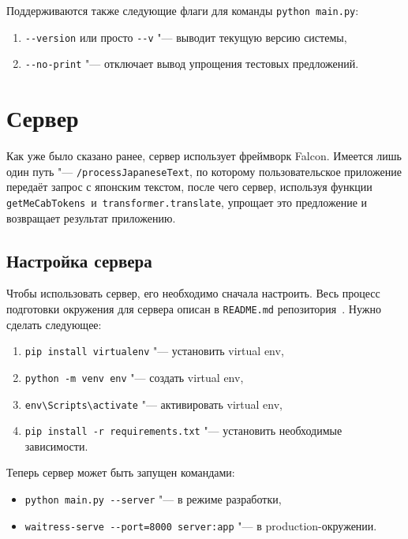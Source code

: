 Поддерживаются также следующие флаги для команды \texttt{python main.py}:
\begin{enumerate}[1.]%
  \item \texttt{-{}-version} или просто \texttt{-{}-v} "--- выводит текущую версию системы,
  \item \texttt{-{}-no-print}  "--- отключает вывод упрощения тестовых предложений.
\end{enumerate}


\section{Сервер}


Как уже было сказано ранее, сервер использует фреймворк Falcon.
Имеется лишь один путь "--- \texttt{/processJapaneseText}, по которому пользовательское приложение передаёт запрос с японским текстом, после чего сервер, используя функции \texttt{getMeCabTokens}~и~\texttt{transformer.translate}, упрощает это предложение и возвращает результат приложению.


\subsection{Настройка сервера}


Чтобы использовать сервер, его необходимо сначала настроить.
Весь процесс подготовки окружения для сервера описан в \texttt{README.md} репозитория~\cite{ServerGithub}.
Нужно сделать следующее:
\begin{enumerate}[1.]%
  \item \texttt{pip install virtualenv} "--- установить virtual env,
  \item \texttt{python -m venv env} "--- создать virtual env,
  \item \texttt{env\textbackslash{}Scripts\textbackslash{}activate} "--- активировать virtual env,
  \item \texttt{pip install -r requirements.txt} "--- установить необходимые зависимости.
\end{enumerate}

Теперь сервер может быть запущен командами:
\begin{itemize}%
  \item \texttt{python main.py -{}-server} "--- в режиме разработки,
  \item \texttt{waitress-serve -{}-port=8000 server:app} "--- в production-окружении.
\end{itemize}


